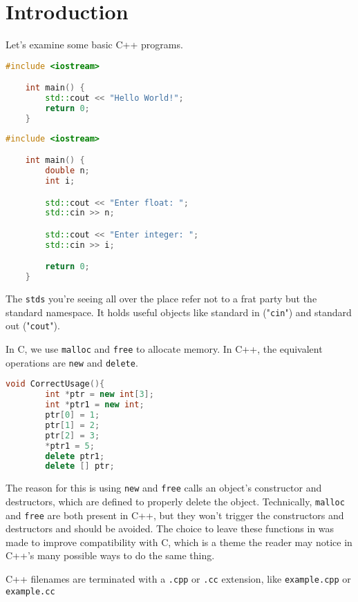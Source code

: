\section{Introduction}
Let's examine some basic C++ programs.
\begin{lstlisting}[language=C++,caption=Hello World]
    #include <iostream>

    int main() {
        std::cout << "Hello World!";
        return 0;
    }
\end{lstlisting}

\begin{lstlisting}[language=C++,caption=User Input]
    #include <iostream>

    int main() {
        double n;
        int i;

        std::cout << "Enter float: ";
        std::cin >> n;

        std::cout << "Enter integer: ";
        std::cin >> i;

        return 0;
    }
\end{lstlisting}

The \texttt{stds} you're seeing all over the place refer not
to a frat party but the standard namespace. It holds
useful objects like standard in ("\texttt{cin}") and standard
out ("\texttt{cout}").

In C, we use \texttt{malloc} and \texttt{free} to allocate memory. In C++,
the equivalent operations are \texttt{new} and \texttt{delete}.

\begin{lstlisting}[language=C++,caption=Free and Delete]
    void CorrectUsage(){
        int *ptr = new int[3];
        int *ptr1 = new int;
        ptr[0] = 1;
        ptr[1] = 2;
        ptr[2] = 3;
        *ptr1 = 5;
        delete ptr1;
        delete [] ptr;        
\end{lstlisting}
The reason for this is using \texttt{new} and \texttt{free} calls
an object's constructor and destructors, which are defined to properly
delete the object. Technically, \texttt{malloc} and \texttt{free} are
both present in C++, but they won't trigger the constructors and
destructors and should be avoided. The choice to leave these functions in
was made to improve compatibility with C, which is a theme the reader
may notice in C++'s many possible ways to do the same thing.

C++ filenames are terminated with a \texttt{.cpp} or \texttt{.cc}
extension, like \texttt{example.cpp} or \texttt{example.cc}